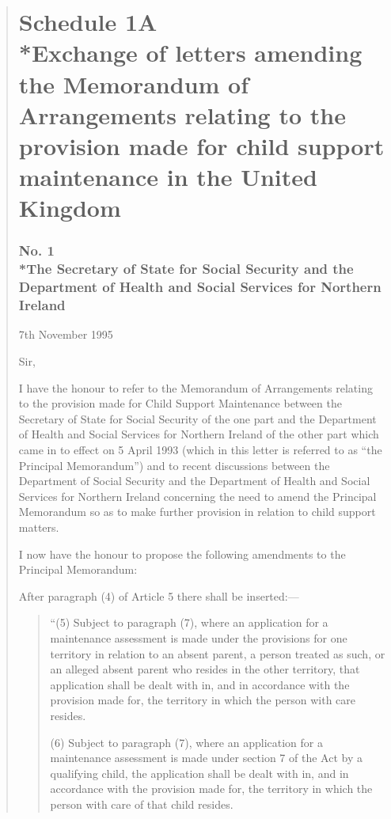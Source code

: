 \documentclass[12pt,a4paper]{article}
\begin{document}
\begin{quotation}
\part*{Schedule 1A\\*Exchange of letters amending the Memorandum of Arrangements relating to the provision made for child support maintenance in the United Kingdom}

\section*{\sloppy No. 1\\*The Secretary of State for Social Security and the Department of Health and Social Services for Northern Ireland}

7th November 1995

  Sir,

  I have the honour to refer to the Memorandum of Arrangements relating to the provision made for Child Support Maintenance between the Secretary of State for Social Security of the one part and the Department of Health and Social Services for Northern Ireland of the other part which came in to effect on 5 April 1993 (which in this letter is referred to as “the Principal Memorandum”) and to recent discussions between the Department of Social Security and the Department of Health and Social Services for Northern Ireland concerning the need to amend the Principal Memorandum so as to make further provision in relation to child support matters.

  I now have the honour to propose the following amendments to the Principal Memorandum:

  After paragraph (4) of Article 5 there shall be inserted:—
\begin{quotation}
 “(5) Subject to paragraph (7), where an application for a maintenance assessment is made under the provisions for one territory in relation to an absent parent, a person treated as such, or an alleged absent parent who resides in the other territory, that application shall be dealt with in, and in accordance with the provision made for, the territory in which the person with care resides.

(6) Subject to paragraph (7), where an application for a maintenance assessment is made under section 7 of the Act by a qualifying child, the application shall be dealt with in, and in accordance with the provision made for, the territory in which the person with care of that child resides.


\end{quotation}
\end{quotation}
\end{document}
